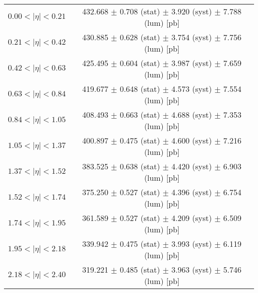 \begin{tabular}{lc}
\hline
$0.00 < |\eta| <0.21$          & 432.668 $\pm$ 0.708 (stat) $\pm$ 3.920 (syst) $\pm$ 7.788 (lum) [pb]  \\
$0.21 < |\eta| <0.42$          & 430.885 $\pm$ 0.628 (stat) $\pm$ 3.754 (syst) $\pm$ 7.756 (lum) [pb]  \\
$0.42 < |\eta| <0.63$          & 425.495 $\pm$ 0.604 (stat) $\pm$ 3.987 (syst) $\pm$ 7.659 (lum) [pb]  \\
$0.63 < |\eta| <0.84$          & 419.677 $\pm$ 0.648 (stat) $\pm$ 4.573 (syst) $\pm$ 7.554 (lum) [pb]  \\
$0.84 < |\eta| <1.05$          & 408.493 $\pm$ 0.663 (stat) $\pm$ 4.688 (syst) $\pm$ 7.353 (lum) [pb]  \\
$1.05 < |\eta| <1.37$          & 400.897 $\pm$ 0.475 (stat) $\pm$ 4.600 (syst) $\pm$ 7.216 (lum) [pb]  \\
$1.37 < |\eta| <1.52$          & 383.525 $\pm$ 0.638 (stat) $\pm$ 4.420 (syst) $\pm$ 6.903 (lum) [pb]  \\
$1.52 < |\eta| <1.74$          & 375.250 $\pm$ 0.527 (stat) $\pm$ 4.396 (syst) $\pm$ 6.754 (lum) [pb]  \\
$1.74 < |\eta| <1.95$          & 361.589 $\pm$ 0.527 (stat) $\pm$ 4.209 (syst) $\pm$ 6.509 (lum) [pb]  \\
$1.95 < |\eta| <2.18$          & 339.942 $\pm$ 0.475 (stat) $\pm$ 3.993 (syst) $\pm$ 6.119 (lum) [pb]  \\
$2.18 < |\eta| <2.40$          & 319.221 $\pm$ 0.485 (stat) $\pm$ 3.963 (syst) $\pm$ 5.746 (lum) [pb]  \\
\hline
\end{tabular}
